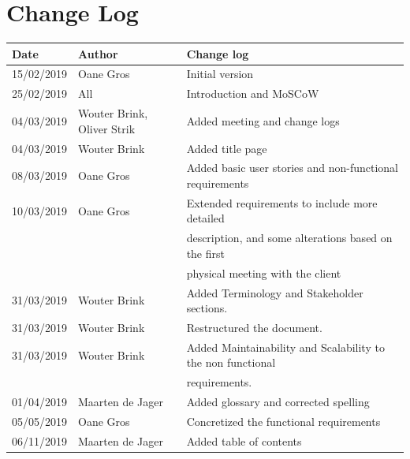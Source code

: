 \documentclass{article}
\begin{document}
\section{Change Log}
\begin{center}
 \begin{tabular}{ | l | l | l | }
  \hline
  \bf{Date} & \bf{Author} & \bf{Change log} \\
  \hline
  15/02/2019 & Oane Gros & Initial version \\
  \hline
  25/02/2019 & All & Introduction and MoSCoW \\
  \hline
  04/03/2019 & Wouter Brink, Oliver Strik & Added meeting and change logs\\
  \hline
  04/03/2019 & Wouter Brink & Added title page \\
  \hline
  08/03/2019 & Oane Gros & Added basic user stories and non-functional requirements \\
  \hline
  10/03/2019 & Oane Gros & Extended requirements to include more detailed \\  & & description,
   and some alterations based on the first \\ & & physical meeting with the client \\
  \hline
  31/03/2019 & Wouter Brink & Added Terminology and Stakeholder sections. \\
  \hline
  31/03/2019 & Wouter Brink & Restructured the document. \\
  \hline
  31/03/2019 & Wouter Brink & Added Maintainability and Scalability to the non functional \\
  & & requirements. \\
  \hline
  01/04/2019 & Maarten de Jager & Added glossary and corrected spelling \\
  \hline
  05/05/2019 & Oane Gros & Concretized the functional requirements \\
  \hline
  06/11/2019 & Maarten de Jager & Added table of contents\\
  \hline
 \end{tabular}
\end{center}
\end{document}
